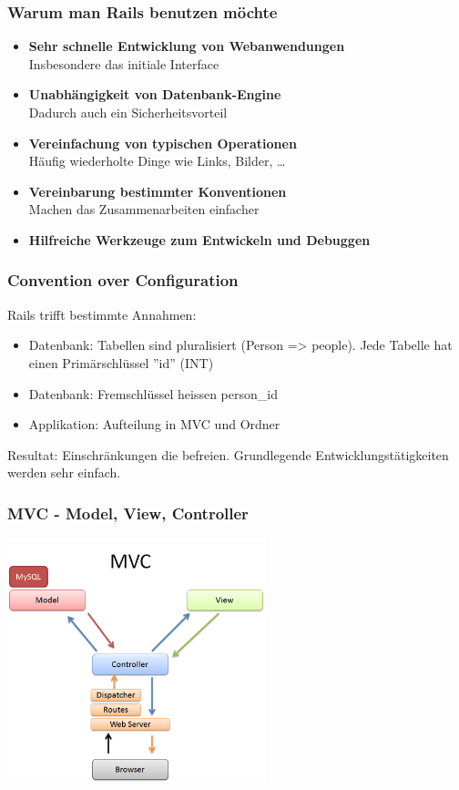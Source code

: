 \begin{frame}
  \frametitle{Warum man Rails benutzen möchte}
  \begin{itemize}
    \item{{\bf Sehr schnelle Entwicklung von Webanwendungen} \\ Insbesondere das initiale Interface}
    \item{{\bf Unabhängigkeit von Datenbank-Engine} \\ Dadurch auch ein Sicherheitsvorteil}
    \item{{\bf Vereinfachung von typischen Operationen} \\ Häufig wiederholte Dinge wie Links, Bilder, \ldots}
    \item{{\bf Vereinbarung bestimmter Konventionen} \\ Machen das Zusammenarbeiten einfacher}
    \item{{\bf Hilfreiche Werkzeuge zum Entwickeln und Debuggen}}
  \end{itemize}
\end{frame}

\begin{frame}
  \frametitle{Convention over Configuration}
  Rails trifft bestimmte Annahmen:
  \vspace{0.5cm}
  \begin{itemize}
    \item Datenbank: Tabellen sind pluralisiert (Person => people). Jede Tabelle hat einen Primärschlüssel ''id'' (INT)
    \item Datenbank: Fremschlüssel heissen person\_id
    \item Applikation: Aufteilung in MVC und Ordner
  \end{itemize}
  \vspace{0.5cm}
  Resultat: Einschränkungen die befreien. Grundlegende Entwicklungstätigkeiten werden sehr einfach.
\end{frame}

\begin{frame}
  \frametitle{MVC - Model, View, Controller}
  \begin{center}
    \includegraphics[width=7.5cm]{img/mvc.png}
  \end{center}
\end{frame}

